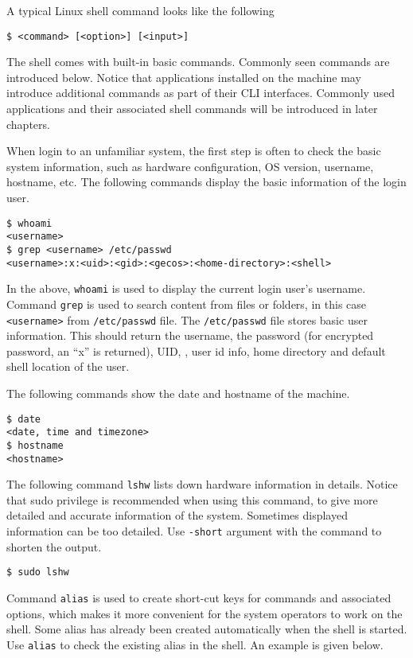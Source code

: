 A typical Linux shell command looks like the following
\begin{lstlisting}
$ <command> [<option>] [<input>]
\end{lstlisting}

The shell comes with built-in basic commands. Commonly seen commands are introduced below. Notice that applications installed on the machine may introduce additional commands as part of their CLI interfaces. Commonly used applications and their associated shell commands will be introduced in later chapters.

When login to an unfamiliar system, the first step is often to check the basic system information, such as hardware configuration, OS version, username, hostname, etc. The following commands display the basic information of the login user.
\begin{lstlisting}
$ whoami
<username>
$ grep <username> /etc/passwd
<username>:x:<uid>:<gid>:<gecos>:<home-directory>:<shell>
\end{lstlisting}
In the above, \verb|whoami| is used to display the current login user's username. Command \verb|grep| is used to search content from files or folders, in this case \verb|<username>| from \verb|/etc/passwd| file. The \verb|/etc/passwd| file stores basic user information. This should return the username, the password (for encrypted password, an ``x'' is returned), UID, , user id info, home directory and default shell location of the user.

The following commands show the date and hostname of the machine.
\begin{lstlisting}
$ date
<date, time and timezone>
$ hostname
<hostname>
\end{lstlisting}

The following command \verb|lshw| lists down hardware information in details. Notice that sudo privilege is recommended when using this command, to give more detailed and accurate information of the system. Sometimes displayed information can be too detailed. Use \verb|-short| argument with the command to shorten the output.
\begin{lstlisting}
$ sudo lshw
\end{lstlisting}

Command \verb|alias| is used to create short-cut keys for commands and associated options, which makes it more convenient for the system operators to work on the shell. Some alias has already been created automatically when the shell is started. Use \verb|alias| to check the existing alias in the shell. An example is given below.

